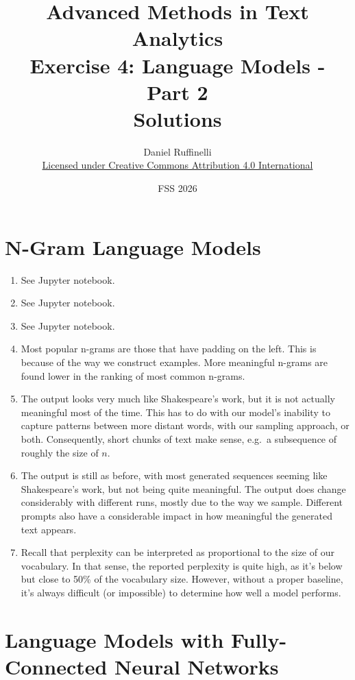 \documentclass[11pt,a4paper]{article}
\title{Advanced Methods in Text Analytics \\ 
Exercise 4: Language Models - Part 2 \\
\textbf{Solutions}}
\author{Daniel Ruffinelli \\ \href{https://creativecommons.org/licenses/by/4.0/}{Licensed under Creative Commons Attribution 4.0 International}}
\date{FSS 2026}
\begin{document}
\maketitle

\section{N-Gram Language Models}

\begin{enumerate}[label=(\alph*)]
    \item See Jupyter notebook.
    \item See Jupyter notebook.
    \item See Jupyter notebook.
    \item Most popular n-grams are those that have padding on the left.
          This is because of the way we construct examples.
          More meaningful n-grams are found lower in the ranking of most common
          n-grams.
    \item The output looks very much like Shakespeare's work, but it is not
          actually meaningful most of the time.
          This has to do with our model's inability to capture patterns
          between more distant words, with our sampling approach, or both.
          Consequently, short chunks of text make sense, e.g.\ a subsequence of
          roughly the size of $n$.
    \item The output is still as before, with most generated sequences seeming
          like Shakespeare's work, but not being quite meaningful.
          The output does change considerably with different runs, mostly due to
          the way we sample.
          Different prompts also have a considerable impact in how meaningful
          the generated text appears.
    \item Recall that perplexity can be interpreted as proportional to the size
          of our vocabulary.
          In that sense, the reported perplexity is quite high, as it's below
          but close to 50\% of the vocabulary size.
          However, without a proper baseline, it's always difficult (or
          impossible) to determine how well a model performs.
\end{enumerate}

\section{Language Models with Fully-Connected Neural Networks}
\end{document}
